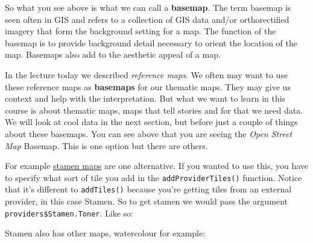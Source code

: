 \documentclass[]{book}
\newenvironment{Shaded}{\begin{snugshade}}{\end{snugshade}}
\newcommand{\CommentTok}[1]{\textcolor[rgb]{0.56,0.35,0.01}{\textit{#1}}}
\newcommand{\DataTypeTok}[1]{\textcolor[rgb]{0.13,0.29,0.53}{#1}}
\newcommand{\DecValTok}[1]{\textcolor[rgb]{0.00,0.00,0.81}{#1}}
\newcommand{\FloatTok}[1]{\textcolor[rgb]{0.00,0.00,0.81}{#1}}
\newcommand{\KeywordTok}[1]{\textcolor[rgb]{0.13,0.29,0.53}{\textbf{#1}}}
\newcommand{\NormalTok}[1]{#1}
\newcommand{\OperatorTok}[1]{\textcolor[rgb]{0.81,0.36,0.00}{\textbf{#1}}}
\newcommand{\StringTok}[1]{\textcolor[rgb]{0.31,0.60,0.02}{#1}}
\begin{document}
So what you see above is what we can call a \textbf{basemap}. The term basemap is seen often in GIS and refers to a collection of GIS data and/or orthorectified imagery that form the background setting for a map. The function of the basemap is to provide background detail necessary to orient the location of the map. Basemaps also add to the aesthetic appeal of a map.

In the lecture today we described \emph{reference maps}. We often may want to use these reference maps as \textbf{basemaps} for our thematic maps. They may give us context and help with the interpretation. But what we want to learn in this course is about thematic maps, maps that tell stories and for that we need data. We will look at cool data in the next section, but before just a couple of things about these basemaps. You can see above that you are seeing the \emph{Open Street Map} Basemap. This is one option but there are others.

For example \href{http://maps.stamen.com/\#toner/12/37.7706/-122.3782}{stamen maps} are one alternative. If you wanted to use this, you have to specify what sort of tile you add in the \texttt{addProviderTiles()} function. Notice that it's different to \texttt{addTiles()} because you're getting tiles from an external provider, in this case Stamen. So to get stamen we would pass the argument \texttt{providers\$Stamen.Toner}. Like so:

\begin{Shaded}
\end{Shaded}

\hypertarget{htmlwidget-8e3216b91328380e22e2}{}

Stamen also has other maps, watercolour for example:

\begin{Shaded}
\end{Shaded}
\end{document}
